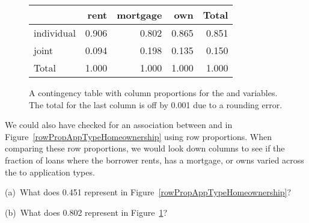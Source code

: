 \begin{figure}[h]
\centering%
\begin{tabular}{l rrr r}
  \hline
  & rent & mortgage & own & Total \\
  \hline
  individual &
      0.906 &
      0.802 &
      0.865 &
      0.851 \\
  joint &
      0.094 &
      0.198 &
      0.135 &
      0.150 \\
  \hline
  Total & 1.000 & 1.000 & 1.000 & 1.000 \\
  \hline
\end{tabular}
\caption{A contingency table with column proportions for the
     and 
    variables.
    The total for the last column is off by 0.001 due
    to a rounding error.}
\label{colPropAppTypeHomeownership}
\end{figure}

We could also have checked for an association between  and  in Figure~\ref{rowPropAppTypeHomeownership} using row proportions. When comparing these row proportions, we would look down columns to see if the fraction of loans where the borrower rents, has a mortgage, or owns varied across the  to  application types.

\D{\newpage}

\begin{exercisewrap}
\begin{nexercise}
(a)~What does 0.451 represent in
Figure~\ref{rowPropAppTypeHomeownership}?

(b)~What does 0.802 represent in
Figure~\ref{colPropAppTypeHomeownership}?\footnotemark{}
\end{nexercise}
\end{exercisewrap}


